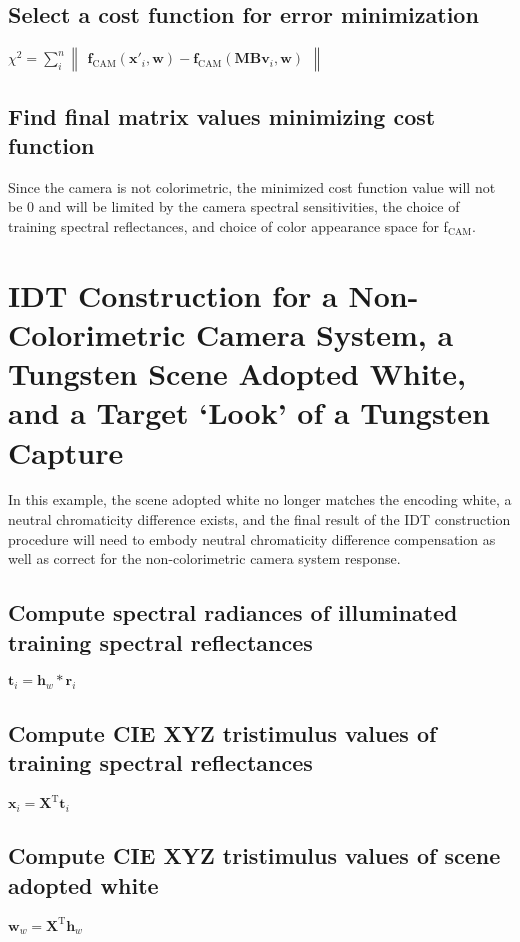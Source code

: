 \subsection{Select a cost function for error minimization}
$\chi^2=\displaystyle\sum_{i}^{n}\begin{Vmatrix}\mathbf{f}_{\mathrm{CAM}}(\mathbf{x}'_i,\mathbf{w})-\mathbf{f}_{\mathrm{CAM}}(\mathbf{MBv}_i,\mathbf{w})\end{Vmatrix}$

\subsection{Find final matrix values minimizing cost function}
Since the camera is not colorimetric, the minimized cost function value will not be 0 and will be limited by the camera spectral sensitivities, the choice of training spectral reflectances, and choice of color appearance space for f$_\mathrm{CAM}$.


\section{IDT Construction for a Non-Colorimetric Camera System, a Tungsten Scene Adopted White, and a Target `Look' of a Tungsten Capture}
In this example, the scene adopted white no longer matches the encoding white, a neutral chromaticity difference exists, and the final result of the IDT construction procedure will need to embody neutral chromaticity difference compensation as well as correct for the non-colorimetric camera system response.

\subsection{Compute spectral radiances of illuminated training spectral reflectances}
$\mathbf{t}_i=\mathbf{h}_w*\mathbf{r}_i$

\subsection{Compute CIE XYZ tristimulus values of training spectral reflectances}
$\mathbf{x}_i=\mathbf{X}^\mathrm{T}\mathbf{t}_i$

\subsection{Compute CIE XYZ tristimulus values of scene adopted white}
$\mathbf{w}_w=\mathbf{X}^\mathrm{T}\mathbf{h}_w$

